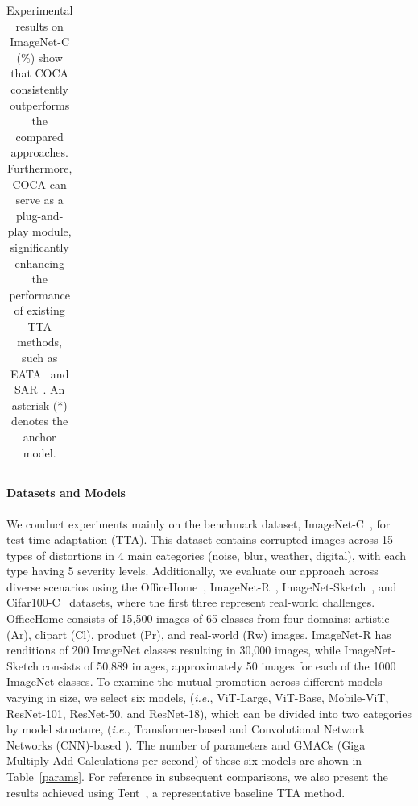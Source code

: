 \begin{table}[t]
\begin{center}
\begin{threeparttable}
{\begin{tabular}{l|c|ccc|cccc|cccc|cccc|c}
\end{tabular}%
        }
    \end{threeparttable}
    \end{center}
    \vspace{-0.2in}
    \caption{ Experimental results on ImageNet-C (\%) show that COCA consistently outperforms the compared approaches. Furthermore, COCA can serve as a plug-and-play module, significantly enhancing the performance of existing TTA methods, such as EATA~\cite{niu2022efficient} and SAR~\cite{niu2023towards}. An asterisk (*) denotes the anchor model.}
    \label{mainres}
    \vspace{-0.15in}
\end{table}





\paragraph{Datasets and Models} We conduct experiments mainly on the benchmark dataset, ImageNet-C~\cite{hendrycks2019benchmarking}, for test-time adaptation (TTA). This dataset contains corrupted images across 15 types of distortions in 4 main categories (noise, blur, weather, digital), with each type having 5 severity levels. Additionally, we evaluate our approach across diverse scenarios using the OfficeHome~\cite{venkateswara2017deep}, ImageNet-R~\cite{hendrycks2021many}, ImageNet-Sketch~\cite{wang2019learning}, and Cifar100-C~\cite{hendrycks2019benchmarking} datasets, where the first three represent real-world challenges. OfficeHome consists of 15,500 images of 65 classes from four domains: artistic (Ar), clipart (Cl), product (Pr), and real-world (Rw) images. ImageNet-R has renditions of 200 ImageNet classes resulting in 30,000 images, while ImageNet-Sketch consists of 50,889 images, approximately 50 images for each of the 1000 ImageNet classes. To examine the mutual promotion across different models varying in size, we select six models, (\textit{i.e.}, ViT-Large, ViT-Base, Mobile-ViT, ResNet-101, ResNet-50, and ResNet-18), which can be divided into two categories by model structure, (\textit{i.e.}, Transformer-based and Convolutional Network Networks (CNN)-based \cite{he2016deep}). The number of parameters and GMACs (Giga Multiply-Add Calculations per second) of these six models are shown in Table~\ref{params}. For reference in subsequent comparisons, we also present the results achieved using Tent~\cite{wang2020tent}, a representative baseline TTA method.

